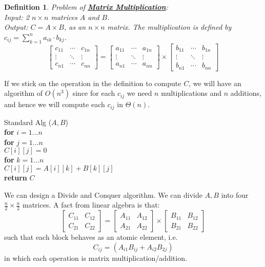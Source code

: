 \documentclass[twoside]{article}
\newcommand{\pc}[1]{\mbox{\textbf{#1}}} %
\newtheorem{protodefinition}[prototheorem]{Definition}
\newenvironment{definition}
{\colorlet{shadecolor}{cyan!15}\begin{shaded}\begin{protodefinition}\normalfont}
		{\end{protodefinition}\end{shaded}}
\begin{document}
\begin{definition}
	Problem of \textbf{\underline{Matrix Multiplication}}: \\
	Input: 2 $n \times n$ matrices $A$ and $B$. \\
	Output: $C = A \times B$, as an $n\times n$ matrix. The multiplication is defined by $c_{ij} = \sum_{k=1}^{n}a_{ik} \cdot b_{kj}$.  
	\begin{equation*}
		\begin{bmatrix}
			c_{11} & \cdots & c_{1n} \\
			\vdots & \ddots & \vdots \\
			c_{n1} & \cdots & c_{nn} 
		\end{bmatrix}
		= 
		\begin{bmatrix}
			a_{11} & \cdots & a_{1n} \\
			\vdots & \ddots & \vdots \\
			a_{n1} & \cdots & a_{nn} 
		\end{bmatrix}
		\times 
		\begin{bmatrix}
			b_{11} & \cdots & b_{1n} \\
			\vdots & \ddots & \vdots \\
			b_{n1} & \cdots & b_{nn} 
		\end{bmatrix}
	\end{equation*}
\end{definition}
If we stick on the operation in the definition to compute $C$, we will have an algorithm of $O(n^3)$ since for each $c_{ij}$ we need $n$ multiplications and $n$ additions, and hence we will compute each $c_{ij}$ in $\Theta(n)$. 
\begin{algorithme}
	Standard Alg ($A, B$)\\
	\>\pc{for} $i = 1 ... n$\\
	\>\> \pc{for} $j = 1 ... n$ \\
	\>\>\> $C[i][j] = 0$\\
	\>\>\>\pc{for} $k = 1 ... n$ \\
	\>\>\>\> $C[i][j] = A[i][k]+B[k][j]$\\
	\>\pc{return} $C$
\end{algorithme}
We can design a Divide and Conquer algorithm. We can divide $A, B$ into four $\frac{n}{2}\times \frac{n}{2}$ matrices. A fact from linear algebra is that: 
\begin{equation*}
	\begin{bmatrix}
		C_{11} & C_{12} \\
		C_{21} & C_{22} 
	\end{bmatrix}
	= 
	\begin{bmatrix}
		A_{11} & A_{12} \\
		A_{21} & A_{22} 
	\end{bmatrix}
	\times 
	\begin{bmatrix}
		B_{11} & B_{12} \\
		B_{21} & B_{22} 
	\end{bmatrix}
\end{equation*} such that each block behaves as an atomic element, i.e. $$C_{ij} = (A_{i1}B_{ij} + A_{i2}B_{2j})$$ in which each operation is matrix multiplication/addition. 
\end{document}
